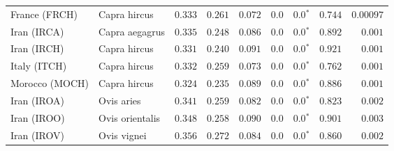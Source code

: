 \begin{center}
\begin{adjustbox}{width = 1\textwidth}
\begin{tabular}{|l|l|r|r|r|r|r|r|r|}
                  France (FRCH) &         Capra hircus &                                        $ 0.333$ &                                           $ 0.261$ &                      $ 0.072$ &            $0.0$ &                  $\bm{0.0{^*}}$ &                                           $ 0.744$ &          $0.00097$ \\
                    Iran (IRCA) &       Capra aegagrus &                                        $ 0.335$ &                                           $ 0.248$ &                      $ 0.086$ &            $0.0$ &                  $\bm{0.0{^*}}$ &                                           $ 0.892$ &           $ 0.001$ \\
                    Iran (IRCH) &         Capra hircus &                                        $ 0.331$ &                                           $ 0.240$ &                      $ 0.091$ &            $0.0$ &                  $\bm{0.0{^*}}$ &                                           $ 0.921$ &           $ 0.001$ \\
                   Italy (ITCH) &         Capra hircus &                                        $ 0.332$ &                                           $ 0.259$ &                      $ 0.073$ &            $0.0$ &                  $\bm{0.0{^*}}$ &                                           $ 0.762$ &           $ 0.001$ \\
                 Morocco (MOCH) &         Capra hircus &                                        $ 0.324$ &                                           $ 0.235$ &                      $ 0.089$ &            $0.0$ &                  $\bm{0.0{^*}}$ &                                           $ 0.886$ &           $ 0.001$ \\
                    Iran (IROA) &           Ovis aries &                                        $ 0.341$ &                                           $ 0.259$ &                      $ 0.082$ &            $0.0$ &                  $\bm{0.0{^*}}$ &                                           $ 0.823$ &           $ 0.002$ \\
                    Iran (IROO) &      Ovis orientalis &                                        $ 0.348$ &                                           $ 0.258$ &                      $ 0.090$ &            $0.0$ &                  $\bm{0.0{^*}}$ &                                           $ 0.901$ &           $ 0.003$ \\
                    Iran (IROV) &          Ovis vignei &                                        $ 0.356$ &                                           $ 0.272$ &                      $ 0.084$ &            $0.0$ &                  $\bm{0.0{^*}}$ &                                           $ 0.860$ &           $ 0.002$ \\

\end{tabular}
\end{adjustbox}
\end{center}
